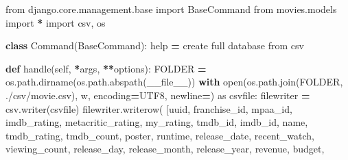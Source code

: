 \documentclass[
]{article}
\newenvironment{Shaded}{\begin{snugshade}}{\end{snugshade}}
\newcommand{\BuiltInTok}[1]{#1}
\newcommand{\ControlFlowTok}[1]{\textcolor[rgb]{0.13,0.29,0.53}{\textbf{#1}}}
\newcommand{\ImportTok}[1]{#1}
\newcommand{\KeywordTok}[1]{\textcolor[rgb]{0.13,0.29,0.53}{\textbf{#1}}}
\newcommand{\NormalTok}[1]{#1}
\newcommand{\OperatorTok}[1]{\textcolor[rgb]{0.81,0.36,0.00}{\textbf{#1}}}
\newcommand{\StringTok}[1]{\textcolor[rgb]{0.31,0.60,0.02}{#1}}
\newcommand{\VariableTok}[1]{\textcolor[rgb]{0.00,0.00,0.00}{#1}}
\begin{document}
\begin{Shaded}
\begin{Highlighting}[]
\ImportTok{from}\NormalTok{ django.core.management.base }\ImportTok{import}\NormalTok{ BaseCommand}
\ImportTok{from}\NormalTok{ movies.models }\ImportTok{import} \OperatorTok{*}
\ImportTok{import}\NormalTok{ csv, os}


\KeywordTok{class}\NormalTok{ Command(BaseCommand):}
    \BuiltInTok{help} \OperatorTok{=} \StringTok{\textquotesingle{}create full database from csv\textquotesingle{}}

    \KeywordTok{def}\NormalTok{ handle(}\VariableTok{self}\NormalTok{, }\OperatorTok{*}\NormalTok{args, }\OperatorTok{**}\NormalTok{options):}
\NormalTok{        FOLDER }\OperatorTok{=}\NormalTok{ os.path.dirname(os.path.abspath(}\VariableTok{\_\_file\_\_}\NormalTok{))}
        \ControlFlowTok{with} \BuiltInTok{open}\NormalTok{(os.path.join(FOLDER, }\StringTok{\textquotesingle{}./csv/movie.csv\textquotesingle{}}\NormalTok{), }\StringTok{\textquotesingle{}w\textquotesingle{}}\NormalTok{,}
\NormalTok{                  encoding}\OperatorTok{=}\StringTok{\textquotesingle{}UTF8\textquotesingle{}}\NormalTok{, newline}\OperatorTok{=}\StringTok{\textquotesingle{}\textquotesingle{}}\NormalTok{) }\ImportTok{as}\NormalTok{ csvfile:}
\NormalTok{            filewriter }\OperatorTok{=}\NormalTok{ csv.writer(csvfile)}
\NormalTok{            filewriter.writerow(}
\NormalTok{                [}\StringTok{\textquotesingle{}uuid\textquotesingle{}}\NormalTok{, }\StringTok{\textquotesingle{}franchise\_id\textquotesingle{}}\NormalTok{, }\StringTok{\textquotesingle{}mpaa\_id\textquotesingle{}}\NormalTok{, }\StringTok{\textquotesingle{}imdb\_rating\textquotesingle{}}\NormalTok{, }\StringTok{\textquotesingle{}metacritic\_rating\textquotesingle{}}\NormalTok{, }\StringTok{\textquotesingle{}my\_rating\textquotesingle{}}\NormalTok{, }\StringTok{\textquotesingle{}tmdb\_id\textquotesingle{}}\NormalTok{,}
                 \StringTok{\textquotesingle{}imdb\_id\textquotesingle{}}\NormalTok{, }\StringTok{\textquotesingle{}name\textquotesingle{}}\NormalTok{, }\StringTok{\textquotesingle{}tmdb\_rating\textquotesingle{}}\NormalTok{, }\StringTok{\textquotesingle{}tmdb\_count\textquotesingle{}}\NormalTok{, }\StringTok{\textquotesingle{}poster\textquotesingle{}}\NormalTok{, }\StringTok{\textquotesingle{}runtime\textquotesingle{}}\NormalTok{, }\StringTok{\textquotesingle{}release\_date\textquotesingle{}}\NormalTok{, }\StringTok{\textquotesingle{}recent\_watch\textquotesingle{}}\NormalTok{,}
                 \StringTok{\textquotesingle{}viewing\_count\textquotesingle{}}\NormalTok{, }\StringTok{\textquotesingle{}release\_day\textquotesingle{}}\NormalTok{, }\StringTok{\textquotesingle{}release\_month\textquotesingle{}}\NormalTok{, }\StringTok{\textquotesingle{}release\_year\textquotesingle{}}\NormalTok{, }\StringTok{\textquotesingle{}revenue\textquotesingle{}}\NormalTok{, }\StringTok{\textquotesingle{}budget\textquotesingle{}}\NormalTok{,}

\end{Highlighting}
\end{Shaded}
\end{document}
